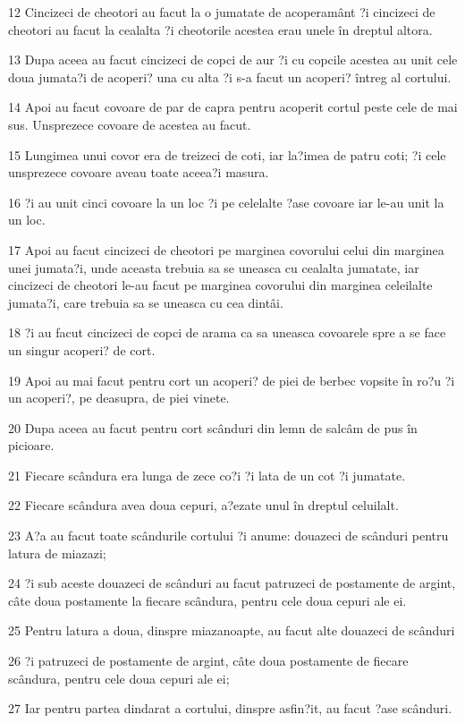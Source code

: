\par 12 Cincizeci de cheotori au facut la o jumatate de acoperamânt ?i cincizeci de cheotori au facut la cealalta ?i cheotorile acestea erau unele în dreptul altora.
\par 13 Dupa aceea au facut cincizeci de copci de aur ?i cu copcile acestea au unit cele doua jumata?i de acoperi? una cu alta ?i s-a facut un acoperi? întreg al cortului.
\par 14 Apoi au facut covoare de par de capra pentru acoperit cortul peste cele de mai sus. Unsprezece covoare de acestea au facut.
\par 15 Lungimea unui covor era de treizeci de coti, iar la?imea de patru coti; ?i cele unsprezece covoare aveau toate aceea?i masura.
\par 16 ?i au unit cinci covoare la un loc ?i pe celelalte ?ase covoare iar le-au unit la un loc.
\par 17 Apoi au facut cincizeci de cheotori pe marginea covorului celui din marginea unei jumata?i, unde aceasta trebuia sa se uneasca cu cealalta jumatate, iar cincizeci de cheotori le-au facut pe marginea covorului din marginea celeilalte jumata?i, care trebuia sa se uneasca cu cea dintâi.
\par 18 ?i au facut cincizeci de copci de arama ca sa uneasca covoarele spre a se face un singur acoperi? de cort.
\par 19 Apoi au mai facut pentru cort un acoperi? de piei de berbec vopsite în ro?u ?i un acoperi?, pe deasupra, de piei vinete.
\par 20 Dupa aceea au facut pentru cort scânduri din lemn de salcâm de pus în picioare.
\par 21 Fiecare scândura era lunga de zece co?i ?i lata de un cot ?i jumatate.
\par 22 Fiecare scândura avea doua cepuri, a?ezate unul în dreptul celuilalt.
\par 23 A?a au facut toate scândurile cortului ?i anume: douazeci de scânduri pentru latura de miazazi;
\par 24 ?i sub aceste douazeci de scânduri au facut patruzeci de postamente de argint, câte doua postamente la fiecare scândura, pentru cele doua cepuri ale ei.
\par 25 Pentru latura a doua, dinspre miazanoapte, au facut alte douazeci de scânduri
\par 26 ?i patruzeci de postamente de argint, câte doua postamente de fiecare scândura, pentru cele doua cepuri ale ei;
\par 27 Iar pentru partea dindarat a cortului, dinspre asfin?it, au facut ?ase scânduri.
